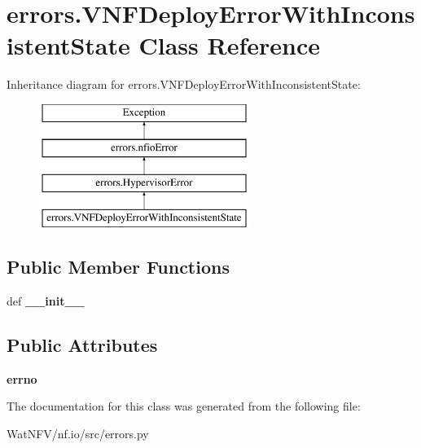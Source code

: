\hypertarget{classerrors_1_1VNFDeployErrorWithInconsistentState}{\section{errors.\-V\-N\-F\-Deploy\-Error\-With\-Inconsistent\-State Class Reference}
\label{classerrors_1_1VNFDeployErrorWithInconsistentState}
}
Inheritance diagram for errors.\-V\-N\-F\-Deploy\-Error\-With\-Inconsistent\-State\-:\begin{figure}[H]
\begin{center}
\leavevmode
\includegraphics[height=4.000000cm]{classerrors_1_1VNFDeployErrorWithInconsistentState}
\end{center}
\end{figure}
\subsection*{Public Member Functions}
\begin{DoxyCompactItemize}
\item 
\hypertarget{classerrors_1_1VNFDeployErrorWithInconsistentState_a9b0a39ff4609e26174942323865fb6a3}{def {\bfseries \-\_\-\-\_\-init\-\_\-\-\_\-}}\label{classerrors_1_1VNFDeployErrorWithInconsistentState_a9b0a39ff4609e26174942323865fb6a3}

\end{DoxyCompactItemize}
\subsection*{Public Attributes}
\begin{DoxyCompactItemize}
\item 
\hypertarget{classerrors_1_1VNFDeployErrorWithInconsistentState_ae4ac3cc6887b7e1483a209649d18d4b0}{{\bfseries errno}}\label{classerrors_1_1VNFDeployErrorWithInconsistentState_ae4ac3cc6887b7e1483a209649d18d4b0}

\end{DoxyCompactItemize}


The documentation for this class was generated from the following file\-:\begin{DoxyCompactItemize}
\item 
Wat\-N\-F\-V/nf.\-io/src/errors.\-py\end{DoxyCompactItemize}
